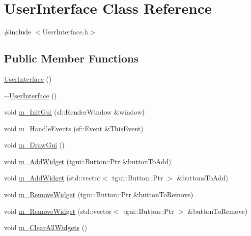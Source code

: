 \hypertarget{class_user_interface}{}\section{User\+Interface Class Reference}
\label{class_user_interface}


{\ttfamily \#include $<$User\+Interface.\+h$>$}

\subsection*{Public Member Functions}
\begin{DoxyCompactItemize}
\item 
\mbox{\hyperlink{class_user_interface_ae6fb70370701b3bd6120e923df9705b0}{User\+Interface}} ()
\item 
\mbox{\hyperlink{class_user_interface_ae588b2ff1711a016dd4c6fc5002c0841}{$\sim$\+User\+Interface}} ()
\item 
void \mbox{\hyperlink{class_user_interface_a707456a50b115144c7763f2d7c3f92f8}{m\+\_\+\+Init\+Gui}} (sf\+::\+Render\+Window \&window)
\item 
void \mbox{\hyperlink{class_user_interface_a31dd4688b939bede613e224747a4cef2}{m\+\_\+\+Handle\+Events}} (sf\+::\+Event \&This\+Event)
\item 
void \mbox{\hyperlink{class_user_interface_a28dae2634ef09733f3f1f28496bdb906}{m\+\_\+\+Draw\+Gui}} ()
\item 
void \mbox{\hyperlink{class_user_interface_a1cdc40b14c55a33279595ccd870051ca}{m\+\_\+\+Add\+Widget}} (tgui\+::\+Button\+::\+Ptr \&button\+To\+Add)
\item 
void \mbox{\hyperlink{class_user_interface_a7435c98fbd6a9011ae9409a2f26a2b09}{m\+\_\+\+Add\+Widget}} (std\+::vector$<$ tgui\+::\+Button\+::\+Ptr $>$ \&buttons\+To\+Add)
\item 
void \mbox{\hyperlink{class_user_interface_afe6b9617c66a5df216c8432830d48385}{m\+\_\+\+Remove\+Widget}} (tgui\+::\+Button\+::\+Ptr \&button\+To\+Remove)
\item 
void \mbox{\hyperlink{class_user_interface_ab3ee4b2923f2b5d193a127ff432bbc4b}{m\+\_\+\+Remove\+Widget}} (std\+::vector$<$ tgui\+::\+Button\+::\+Ptr $>$ \&button\+To\+Remove)
\item 
void \mbox{\hyperlink{class_user_interface_a8d075d4afd4a99453c5f823066c346c1}{m\+\_\+\+Clear\+All\+Widgets}} ()
\end{DoxyCompactItemize}


